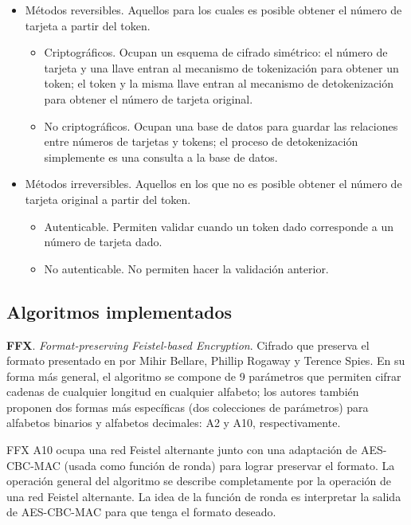 \begin{itemize}
  \item Métodos reversibles. Aquellos para los cuales es posible obtener el
    número de tarjeta a partir del token.
    \begin{itemize}
      \item Criptográficos. Ocupan un esquema de cifrado simétrico: el número
        de tarjeta y una llave entran al mecanismo de tokenización para obtener
        un token; el token y la misma llave entran al mecanismo de
        detokenización para obtener el número de tarjeta original.
      \item No criptográficos. Ocupan una base de datos para guardar las
        relaciones entre números de tarjetas y tokens; el proceso de
        detokenización simplemente es una consulta a la base de datos.
    \end{itemize}
  \item Métodos irreversibles. Aquellos en los que no es posible obtener el
    número de tarjeta original a partir del token.
    \begin{itemize}
      \item Autenticable. Permiten validar cuando un token dado corresponde a
        un número de tarjeta dado.
      \item No autenticable. No permiten hacer la validación anterior.
    \end{itemize}
\end{itemize}

\subsection{Algoritmos implementados}
\label{sec:implementaciones}

\textbf{FFX}. \textit{Format-preserving Feistel-based Encryption}. Cifrado que
preserva el formato presentado en \cite{ffx_1} por Mihir Bellare, Phillip
Rogaway y Terence Spies.  En su forma más general, el algoritmo se compone de 9
parámetros que permiten cifrar cadenas de cualquier longitud en cualquier
alfabeto; los autores también proponen dos formas más específicas (dos
colecciones de parámetros) para alfabetos binarios y alfabetos decimales: A2 y
A10, respectivamente.

FFX A10 ocupa una red Feistel alternante junto con una adaptación de AES-CBC-MAC
(usada como función de ronda) para lograr preservar el formato. La operación
general del algoritmo se describe completamente por la operación de una red
Feistel alternante. La idea de la función de ronda es interpretar la salida de
AES-CBC-MAC para que tenga el formato deseado.

